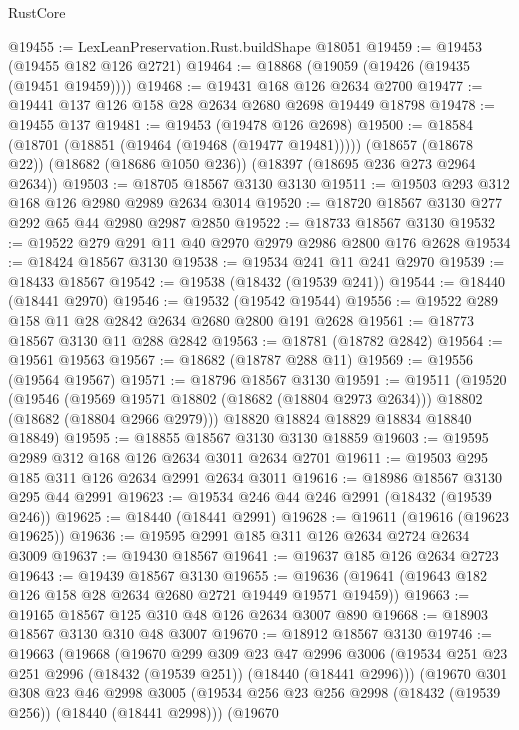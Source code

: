 \begin{lexlean}{RustCore}
\begin{coremodule}
@19455 := LexLeanPreservation.Rust.buildShape @18051
@19459 := @19453 (@19455 @182 @126 @2721)
@19464 := @18868 (@19059 (@19426 (@19435 (@19451 @19459))))
@19468 := @19431 @168 @126 @2634 @2700
@19477 := @19441 @137 @126 @158 @28 @2634 @2680 @2698 @19449 @18798
@19478 := @19455 @137
@19481 := @19453 (@19478 @126 @2698)
@19500 := @18584
    (@18701 (@18851 (@19464 (@19468 (@19477 @19481)))))
    (@18657 (@18678 @22))
    (@18682 (@18686 @1050 @236))
    (@18397 (@18695 @236 @273 @2964 @2634))
@19503 := @18705 @18567 @3130 @3130
@19511 := @19503 @293 @312 @168 @126 @2980 @2989 @2634 @3014
@19520 := @18720 @18567 @3130 @277 @292 @65 @44 @2980 @2987 @2850
@19522 := @18733 @18567 @3130
@19532 := @19522 @279 @291 @11 @40 @2970 @2979 @2986 @2800 @176 @2628
@19534 := @18424 @18567 @3130
@19538 := @19534 @241 @11 @241 @2970
@19539 := @18433 @18567
@19542 := @19538 (@18432 (@19539 @241))
@19544 := @18440 (@18441 @2970)
@19546 := @19532 (@19542 @19544)
@19556 := @19522 @289 @158 @11 @28 @2842 @2634 @2680 @2800 @191 @2628
@19561 := @18773 @18567 @3130 @11 @288 @2842
@19563 := @18781 (@18782 @2842)
@19564 := @19561 @19563
@19567 := @18682 (@18787 @288 @11)
@19569 := @19556 (@19564 @19567)
@19571 := @18796 @18567 @3130
@19591 := @19511
    (@19520
      (@19546
        (@19569 @19571 @18802 (@18682 (@18804 @2973 @2634)))
        @18802
        (@18682 (@18804 @2966 @2979)))
      @18820
      @18824
      @18829
      @18834
      @18840
      @18849)
@19595 := @18855 @18567 @3130 @3130 @18859
@19603 := @19595 @2989 @312 @168 @126 @2634 @3011 @2634 @2701
@19611 := @19503 @295 @185 @311 @126 @2634 @2991 @2634 @3011
@19616 := @18986 @18567 @3130 @295 @44 @2991
@19623 := @19534 @246 @44 @246 @2991 (@18432 (@19539 @246))
@19625 := @18440 (@18441 @2991)
@19628 := @19611 (@19616 (@19623 @19625))
@19636 := @19595 @2991 @185 @311 @126 @2634 @2724 @2634 @3009
@19637 := @19430 @18567
@19641 := @19637 @185 @126 @2634 @2723
@19643 := @19439 @18567 @3130
@19655 := @19636 (@19641 (@19643 @182 @126 @158 @28 @2634 @2680 @2721 @19449 @19571 @19459))
@19663 := @19165 @18567 @125 @310 @48 @126 @2634 @3007 @890
@19668 := @18903 @18567 @3130 @310 @48 @3007
@19670 := @18912 @18567 @3130
@19746 := @19663
    (@19668
      (@19670
        @299
        @309
        @23
        @47
        @2996
        @3006
        (@19534 @251 @23 @251 @2996 (@18432 (@19539 @251)) (@18440 (@18441 @2996)))
        (@19670
          @301
          @308
          @23
          @46
          @2998
          @3005
          (@19534 @256 @23 @256 @2998 (@18432 (@19539 @256)) (@18440 (@18441 @2998)))
          (@19670

\end{coremodule}
\end{lexlean}

